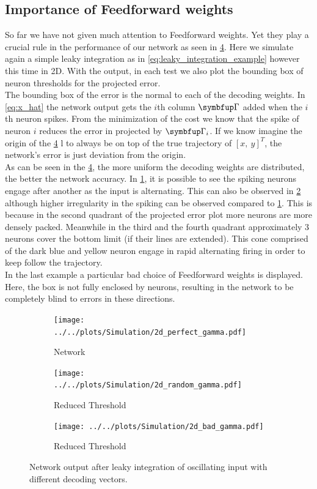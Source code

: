\subsection{Importance of Feedforward weights}
So far we have not given much attention to Feedforward weights. Yet they play a crucial rule in the performance of our network as seen in \cref{fig:sim_res_3}. Here we simulate again a simple leaky integration as in \cref{eq:leaky_integration_example} however this time in 2D. With the output, in each test we also plot the bounding box of neuron thresholds for the projected error.\\
The bounding box of the error is the normal to each of the decoding weights. In \cref{eq:x_hat} the network output gets the $i$th column $\bmu{\Gamma}$ added when the $i$th neuron spikes. From the minimization of the cost we know that the spike of neuron $i$ reduces the error in projected by $\bmu{\Gamma}_i$. If we know imagine the origin of the \cref{fig:sim_res_3} l to always be on top of the true trajectory of $\left[x ,\ y\right]^T$, the network's error is just deviation from the origin.\\
As can be seen in the \cref{fig:sim_res_3}, the more uniform the decoding weights are distributed, the better the network accuracy. In \cref{fig:sim_perfect_gamma}, it is possible to see the spiking neurons engage after another as the input is alternating. This can also be observed in \cref{fig:sim_random_gamma} although higher irregularity in the spiking can be observed compared to \cref{fig:sim_perfect_gamma}. This is because in the second quadrant of the projected error plot more neurons are more densely packed. Meanwhile in the third and the fourth quadrant approximately 3 neurons cover the bottom limit (if their lines are extended). This cone comprised of the dark blue and yellow neuron engage in rapid alternating firing in order to keep follow the trajectory.\\
In the last example a particular bad choice of Feedforward weights is displayed. Here, the box is not fully enclosed by neurons, resulting in the network to be completely blind to errors in these directions.
\begin{figure}[h!]
		\centering
	\begin{subfigure}[t]{0.6\textwidth}
		\centering
		\texttt{[image: ../../plots/Simulation/2d\_perfect\_gamma.pdf]}
		\caption{Network }
		\label{fig:sim_perfect_gamma}
	\end{subfigure}
	\hfill
	\begin{subfigure}[t]{0.6\textwidth}
		\centering
		\texttt{[image: ../../plots/Simulation/2d\_random\_gamma.pdf]}
		\caption{Reduced Threshold}
		\label{fig:sim_random_gamma}
	\end{subfigure}
	\hfill
\begin{subfigure}[t]{0.6\textwidth}
	\centering
	\texttt{[image: ../../plots/Simulation/2d\_bad\_gamma.pdf]}
	\caption{Reduced Threshold}
	\label{fig:sim_bad_gamma}
\end{subfigure}
	\caption{Network output after leaky integration of oscillating input with different decoding vectors.}
	\label{fig:sim_res_3}
\end{figure}


